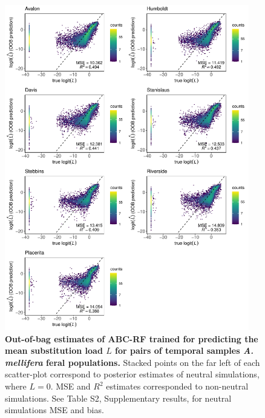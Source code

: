 \documentclass[a4paper, 12pt]{article}
\begin{document}
\begin{figure}[ht]
 \centering
 \includegraphics[width=0.95\textwidth]{Figures/FigureS22_combined_plot_load.pdf}
 \small\caption{\textbf{Out-of-bag estimates of ABC-RF trained for predicting the mean substitution load $L$ for pairs of temporal samples \textit{A. mellifera} feral populations.} Stacked points on the far left of each scatter-plot correspond to posterior estimates of neutral simulations, where $L = 0$. MSE and $R^2$ estimates corresponded to non-neutral simulations. See Table S2, Supplementary results, for neutral simulations MSE and bias.}
 \label{fig:supple_feralbee_load}
\end{figure}
\end{document}
